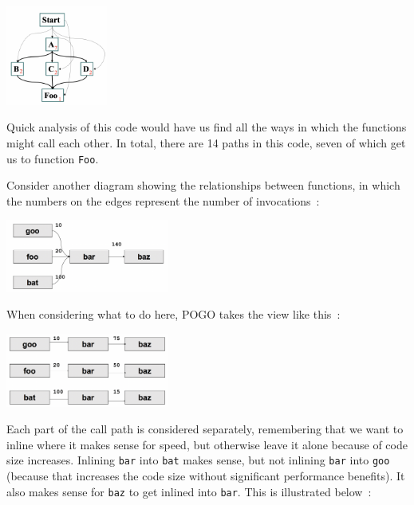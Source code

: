\documentclass[a4paper]{report}
\begin{document}
\begin{center}
	\includegraphics[width=0.25\textwidth]{images/callpaths.png}
\end{center}

Quick analysis of this code would have us find all the ways in which the functions might call each other. In total, there are 14 paths in this code, seven of which get us to function \texttt{Foo}.  

Consider another diagram showing the relationships between functions, in which the numbers on the edges represent the number of invocations~\cite{pogo2}:

\begin{center}
	\includegraphics[width=0.4\textwidth]{images/callpaths2.png}
\end{center}

When considering what to do here, POGO takes the view like this~\cite{pogo2}:

\begin{center}
	\includegraphics[width=0.4\textwidth]{images/callpaths3.png}
\end{center}

Each part of the call path is considered separately, remembering that we want to inline where it makes sense for speed, but otherwise leave it alone because of code size increases. Inlining \texttt{bar} into \texttt{bat} makes sense, but not inlining \texttt{bar} into \texttt{goo} (because that increases the code size without significant performance benefits). It also makes sense for \texttt{baz} to get inlined into \texttt{bar}. This is illustrated below~\cite{pogo2}:
\end{document}
